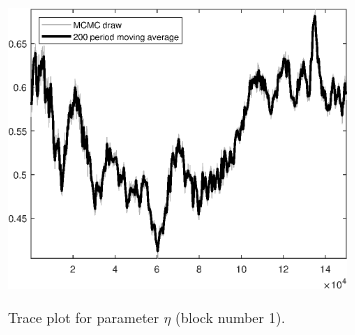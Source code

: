 \begin{figure}[H]
\centering
  \includegraphics[width=0.8\textwidth]{BRS_sectoral_KK/graphs/TracePlot_eta_blck_1}\\
    \caption{Trace plot for parameter ${\eta}$ (block number 1).}
\end{figure}
